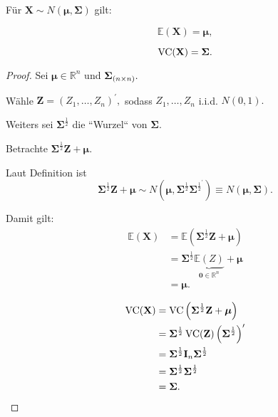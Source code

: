 \documentclass{tstextbook}
\begin{document}
\begin{theorem}
 Für $ \textbf{X}\sim N\left(\boldsymbol{\mu},\boldsymbol{\Sigma}\right) $ gilt:
 
 \[
 \mathbb{E}(\textbf{X})=\boldsymbol{\mu},
 \]
 
 \[
 \operatorname{VC}(\textbf{X})=\boldsymbol{\Sigma}.
 \]
\end{theorem}
\begin{proof}
Sei $\boldsymbol{\mu}\in\mathbb{R}^{n}$ und $\boldsymbol{\Sigma_}{(n\times n)}.$

Wähle $\textbf{Z}=\left(Z_{1},\ldots,Z_{n}\right)^{\prime},$ sodass $Z_{1},\ldots,Z_{n}$
i.i.d. $N(0,1).$

Weiters sei $\boldsymbol{\Sigma}^{\frac{1}{2}}$ die ``Wurzel`` von $\boldsymbol{\Sigma}.$

Betrachte $\boldsymbol{\Sigma}^{\frac{1}{2}}\textbf{Z}+\boldsymbol{\mu}.$ 

Laut Definition ist 
\[
\boldsymbol{\Sigma}^{\frac{1}{2}}\textbf{Z}+\boldsymbol{\mu}\sim N\left(\boldsymbol{\mu},\boldsymbol{\Sigma}^{\frac{1}{2}}\boldsymbol{\Sigma}^{\frac{1}{2}^{\prime}}\right)\equiv N\left(\boldsymbol{\mu},\boldsymbol{\Sigma}\right).
\]

Damit gilt:
\begin{align*}
	\mathbb{E}(\textbf{X}) & =\mathbb{E}\left(\boldsymbol{\Sigma}^{\frac{1}{2}}\textbf{Z}+\boldsymbol{\mu}\right)\\
	& =\boldsymbol{\Sigma}^{\frac{1}{2}}\underset{\boldsymbol{0}\in\mathbb{R}^{n}}{\underbrace{\mathbb{E}(Z)}}+\boldsymbol{\mu}\\
	& =\boldsymbol{\mu}.
\end{align*}

\begin{align*}
	\operatorname{VC}(\textbf{X}) & =\operatorname{VC}\left(\boldsymbol{\Sigma}^{\frac{1}{2}}\textbf{Z}+\boldsymbol{\mu}\right)\\
	& =\boldsymbol{\Sigma}^{\frac{1}{2}}\operatorname{VC}(\textbf{Z})\left(\boldsymbol{\Sigma}^{\frac{1}{2}}\right)^{\prime}\\
	& =\boldsymbol{\Sigma}^{\frac{1}{2}}\textbf{I}_{n}\boldsymbol{\Sigma}^{\frac{1}{2}}\\
	& =\boldsymbol{\Sigma}^{\frac{1}{2}}\boldsymbol{\Sigma}^{\frac{1}{2}}\\
	& =\boldsymbol{\Sigma}.
\end{align*}

\end{proof}
\end{document}
